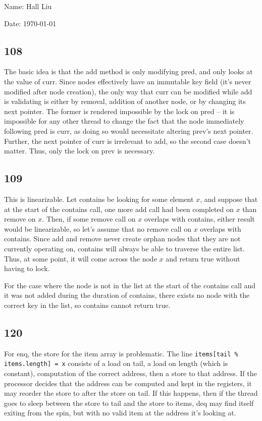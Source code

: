 \documentclass{article}
\begin{document}
Name: Hall Liu

Date: \today 
\vspace{1.5cm}

\subsection*{108}
The basic idea is that the add method is only modifying pred, and only looks at the value of curr. Since nodes effectively have an immutable key field (it's never modified after node creation), the only way that curr can be modified while add is validating is either by removal, addition of another node, or by changing its next pointer. The former is rendered impossible by the lock on pred -- it is impossible for any other thread to change the fact that the node immediately following pred is curr, as doing so would necessitate altering prev's next pointer. Further, the next pointer of curr is irrelevant to add, so the second case doesn't matter. Thus, only the lock on prev is necessary.
\subsection*{109}
This is linearizable. Let contains be looking for some element $x$, and suppose that at the start of the contains call, one more add call had been completed on $x$ than remove on $x$. Then, if some remove call on $x$ overlaps with contains, either result would be linearizable, so let's assume that no remove call on $x$ overlaps with contains. Since add and remove never create orphan nodes that they are not currently operating on, contains will always be able to traverse the entire list. Thus, at some point, it will come across the node $x$ and return true without having to lock. 

For the case where the node is not in the list at the start of the contains call and it was not added during the duration of contains, there exists no node with the correct key in the list, so contains cannot return true.
\subsection*{120}
For enq, the store for the item array is problematic. The line \verb|items[tail % items.length] = x| consists of a load on tail, a load on length (which is constant), computation of the correct address, then a store to that address. If the processor decides that the address can be computed and kept in the registers, it may reorder the store to after the store on tail. If this happens, then if the thread goes to sleep between the store to tail and the store to items, deq may find itself exiting from the spin, but with no valid item at the address it's looking at.
\end{document}
